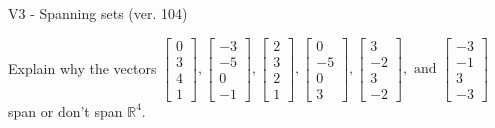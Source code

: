 \begin{exercise}
  \begin{exerciseTitle}V3 - Spanning sets (ver. 104)\end{exerciseTitle}
  \begin{exerciseStatement}
    Explain why the vectors \(\left[\begin{array}{r}
0 \\
3 \\
4 \\
1
\end{array}\right] , \left[\begin{array}{r}
-3 \\
-5 \\
0 \\
-1
\end{array}\right] , \left[\begin{array}{r}
2 \\
3 \\
2 \\
1
\end{array}\right] , \left[\begin{array}{r}
0 \\
-5 \\
0 \\
3
\end{array}\right] , \left[\begin{array}{r}
3 \\
-2 \\
3 \\
-2
\end{array}\right] , \text{ and } \left[\begin{array}{r}
-3 \\
-1 \\
3 \\
-3
\end{array}\right]\) span or don't span \(\mathbb{R}^4\). 
	



\end{exerciseStatement}
\end{exercise}
